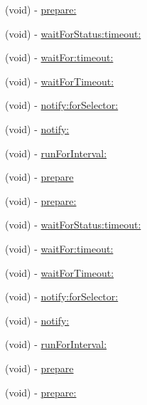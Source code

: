 \begin{DoxyCompactItemize}
\item 
(void) -\/ \hyperlink{interface_g_h_async_test_case_a085b47a16f4a790d77ba78bd2eafb3ff}{prepare\-:}
\item 
(void) -\/ \hyperlink{interface_g_h_async_test_case_ae8781529003ebef3a06569c0157687ae}{wait\-For\-Status\-:timeout\-:}
\item 
(void) -\/ \hyperlink{interface_g_h_async_test_case_a43422127c8303a93f0ae39c883a2da06}{wait\-For\-:timeout\-:}
\item 
(void) -\/ \hyperlink{interface_g_h_async_test_case_aaf22dd45b3493e110362392cc3dc086b}{wait\-For\-Timeout\-:}
\item 
(void) -\/ \hyperlink{interface_g_h_async_test_case_ab1be43eb4f4909ce5607b51fa0a1f40b}{notify\-:for\-Selector\-:}
\item 
(void) -\/ \hyperlink{interface_g_h_async_test_case_ad21d6cdd1f2a284ee7b5ad5b6d1c82e2}{notify\-:}
\item 
(void) -\/ \hyperlink{interface_g_h_async_test_case_accbc972d3d516d1e53529c84fa2fc510}{run\-For\-Interval\-:}
\item 
(void) -\/ \hyperlink{interface_g_h_async_test_case_a8eda5b64c599e0c48bbd206840bd4cde}{prepare}
\item 
(void) -\/ \hyperlink{interface_g_h_async_test_case_a085b47a16f4a790d77ba78bd2eafb3ff}{prepare\-:}
\item 
(void) -\/ \hyperlink{interface_g_h_async_test_case_ae8781529003ebef3a06569c0157687ae}{wait\-For\-Status\-:timeout\-:}
\item 
(void) -\/ \hyperlink{interface_g_h_async_test_case_a43422127c8303a93f0ae39c883a2da06}{wait\-For\-:timeout\-:}
\item 
(void) -\/ \hyperlink{interface_g_h_async_test_case_aaf22dd45b3493e110362392cc3dc086b}{wait\-For\-Timeout\-:}
\item 
(void) -\/ \hyperlink{interface_g_h_async_test_case_ab1be43eb4f4909ce5607b51fa0a1f40b}{notify\-:for\-Selector\-:}
\item 
(void) -\/ \hyperlink{interface_g_h_async_test_case_ad21d6cdd1f2a284ee7b5ad5b6d1c82e2}{notify\-:}
\item 
(void) -\/ \hyperlink{interface_g_h_async_test_case_accbc972d3d516d1e53529c84fa2fc510}{run\-For\-Interval\-:}
\item 
(void) -\/ \hyperlink{interface_g_h_async_test_case_a8eda5b64c599e0c48bbd206840bd4cde}{prepare}
\item 
(void) -\/ \hyperlink{interface_g_h_async_test_case_a085b47a16f4a790d77ba78bd2eafb3ff}{prepare\-:}

\end{DoxyCompactItemize}
